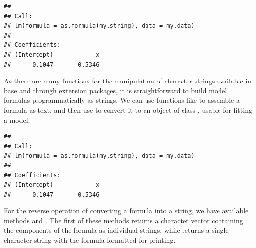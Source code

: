 \documentclass[krantz2]{krantz}\usepackage{knitr}
\begin{document}
\begin{explainbox}
\begin{knitrout}\footnotesize
{}\color{fgcolor}\begin{kframe}
\begin{alltt}
 \hlkwb{<-} 
\hlstd{(}  
\end{alltt}
\begin{verbatim}
## 
## Call:
## lm(formula = as.formula(my.string), data = my.data)
## 
## Coefficients:
## (Intercept)            x  
##     -0.1047       0.5346
\end{verbatim}
\end{kframe}
\end{knitrout}

As there are many functions for the manipulation of character strings available in base \Rlang and through extension packages, it is straightforward to build model formulas programmatically as strings. We can use functions like  to assemble a formula as text, and then use  to convert it to an object of class , usable for fitting a model.

\begin{knitrout}\footnotesize
{}\color{fgcolor}\begin{kframe}
\begin{alltt}
 \hlkwb{<-} \hlstd{(}\hlstd{,} \hlstd{,}  \hlstd{=} \hlstd{)}
\hlstd{(}  
\end{alltt}
\begin{verbatim}
## 
## Call:
## lm(formula = as.formula(my.string), data = my.data)
## 
## Coefficients:
## (Intercept)            x  
##     -0.1047       0.5346
\end{verbatim}
\end{kframe}
\end{knitrout}

For the reverse operation of converting a formula into a string, we have available methods  and . The first of these methods returns a character vector containing the components of the formula as individual strings, while  returns a single character string with the formula formatted for printing.


\end{explainbox}
\end{document}
